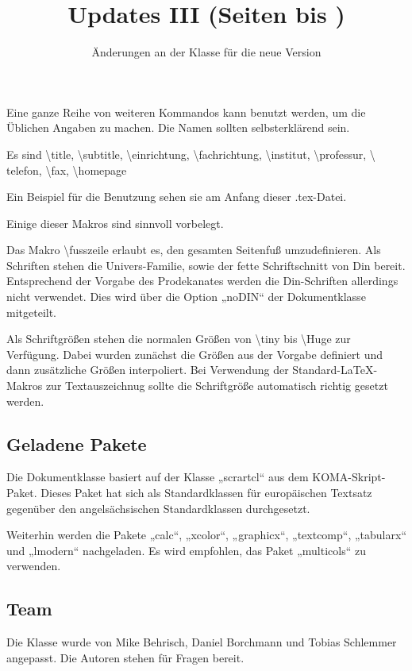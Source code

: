\documentclass[a0paper,noDIN,MathematikA0]{tudmathposter}
\begin{document}
\begin{multicols}{2}
  Eine ganze Reihe von weiteren Kommandos kann benutzt werden, um
  die Üblichen Angaben zu machen. Die Namen sollten selbsterklärend
  sein.

  Es sind \textbackslash title, \textbackslash subtitle,
  \textbackslash einrichtung, \textbackslash fachrichtung,
  \textbackslash institut, \textbackslash professur, \textbackslash
  telefon, \textbackslash fax, \textbackslash homepage
  
  Ein Beispiel für die Benutzung sehen sie am Anfang dieser .tex-Datei.
  
  Einige dieser Makros sind sinnvoll vorbelegt.
  
  Das Makro
  \textbackslash fusszeile erlaubt es, den gesamten Seitenfuß
  umzudefinieren.
  Als Schriften stehen die Univers-Familie, sowie der fette
  Schriftschnitt von Din bereit. Entsprechend der Vorgabe des
  Prodekanates werden die Din-Schriften allerdings nicht
  verwendet. Dies wird über die Option „noDIN“ der Dokumentklasse
  mitgeteilt.

  Als Schriftgrößen stehen die normalen Größen von \textbackslash tiny
  bis \textbackslash Huge zur Verfügung. Dabei wurden zunächst die
  Größen aus der Vorgabe definiert und dann zusätzliche Größen
  interpoliert. Bei Verwendung der Standard-\LaTeX-Makros zur
  Textauszeichnug sollte die Schriftgröße automatisch richtig gesetzt
  werden.
  \enlargethispage{4\baselineskip}
\subsection{Geladene Pakete}
  Die Dokumentklasse basiert auf der Klasse „scrartcl“ aus dem
  KOMA-Skript-Paket. Dieses Paket hat sich als Standardklassen für
  europäischen Textsatz gegenüber den angelsächsischen Standardklassen
  durchgesetzt.

  Weiterhin werden die Pakete „calc“, „xcolor“, „graphicx“,
  „textcomp“, „tabularx“ und „lmodern“ nachgeladen. Es wird empfohlen,
  das Paket „multicols“ zu verwenden.

  \subsection{Team}
  Die Klasse wurde von Mike Behrisch, Daniel Borchmann und Tobias
  Schlemmer angepasst. Die Autoren stehen für Fragen bereit.
\end{multicols}
\pagebreak
\fax{}\label{Updanfang}%
\title{Updates III (Seiten \pageref{Updanfang} bis \pageref{Updende})}%
\subtitle{Änderungen an der Klasse für die neue Version}
\maketitle
\end{document}
